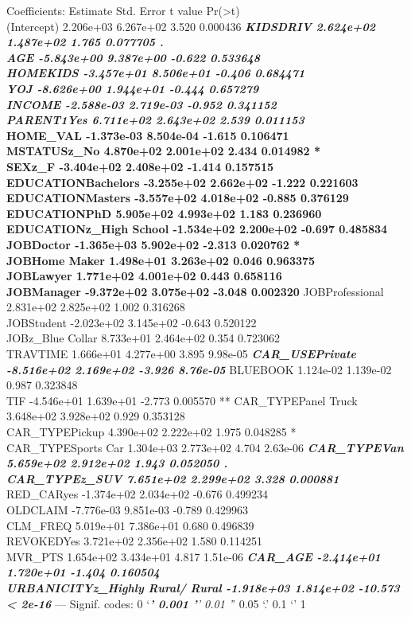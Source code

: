 \documentclass[]{article}
\begin{document}
Coefficients: Estimate Std. Error t value
Pr(\textgreater{}\textbar{}t\textbar{})\\
(Intercept) 2.206e+03 6.267e+02 3.520 0.000436 \textbf{\emph{ KIDSDRIV
2.624e+02 1.487e+02 1.765 0.077705 .\\
AGE -5.843e+00 9.387e+00 -0.622 0.533648\\
HOMEKIDS -3.457e+01 8.506e+01 -0.406 0.684471\\
YOJ -8.626e+00 1.944e+01 -0.444 0.657279\\
INCOME -2.588e-03 2.719e-03 -0.952 0.341152\\
PARENT1Yes 6.711e+02 2.643e+02 2.539 0.011153 }\\
HOME\_VAL -1.373e-03 8.504e-04 -1.615 0.106471\\
MSTATUSz\_No 4.870e+02 2.001e+02 2.434 0.014982 *\\
SEXz\_F -3.404e+02 2.408e+02 -1.414 0.157515\\
EDUCATIONBachelors -3.255e+02 2.662e+02 -1.222 0.221603\\
EDUCATIONMasters -3.557e+02 4.018e+02 -0.885 0.376129\\
EDUCATIONPhD 5.905e+02 4.993e+02 1.183 0.236960\\
EDUCATIONz\_High School -1.534e+02 2.200e+02 -0.697 0.485834\\
JOBDoctor -1.365e+03 5.902e+02 -2.313 0.020762 *\\
JOBHome Maker 1.498e+01 3.263e+02 0.046 0.963375\\
JOBLawyer 1.771e+02 4.001e+02 0.443 0.658116\\
JOBManager -9.372e+02 3.075e+02 -3.048 0.002320 } JOBProfessional
2.831e+02 2.825e+02 1.002 0.316268\\
JOBStudent -2.023e+02 3.145e+02 -0.643 0.520122\\
JOBz\_Blue Collar 8.733e+01 2.464e+02 0.354 0.723062\\
TRAVTIME 1.666e+01 4.277e+00 3.895 9.98e-05 \textbf{\emph{
CAR\_USEPrivate -8.516e+02 2.169e+02 -3.926 8.76e-05 }} BLUEBOOK
1.124e-02 1.139e-02 0.987 0.323848\\
TIF -4.546e+01 1.639e+01 -2.773 0.005570 ** CAR\_TYPEPanel Truck
3.648e+02 3.928e+02 0.929 0.353128\\
CAR\_TYPEPickup 4.390e+02 2.222e+02 1.975 0.048285 *\\
CAR\_TYPESports Car 1.304e+03 2.773e+02 4.704 2.63e-06 \textbf{\emph{
CAR\_TYPEVan 5.659e+02 2.912e+02 1.943 0.052050 .\\
CAR\_TYPEz\_SUV 7.651e+02 2.299e+02 3.328 0.000881 }} RED\_CARyes
-1.374e+02 2.034e+02 -0.676 0.499234\\
OLDCLAIM -7.776e-03 9.851e-03 -0.789 0.429963\\
CLM\_FREQ 5.019e+01 7.386e+01 0.680 0.496839\\
REVOKEDYes 3.721e+02 2.356e+02 1.580 0.114251\\
MVR\_PTS 1.654e+02 3.434e+01 4.817 1.51e-06 \textbf{\emph{ CAR\_AGE
-2.414e+01 1.720e+01 -1.404 0.160504\\
URBANICITYz\_Highly Rural/ Rural -1.918e+03 1.814e+02 -10.573
\textless{} 2e-16 }} --- Signif. codes: 0 `\emph{\textbf{' 0.001 '}'
0.01 '}' 0.05 `.' 0.1 `' 1
\end{document}
